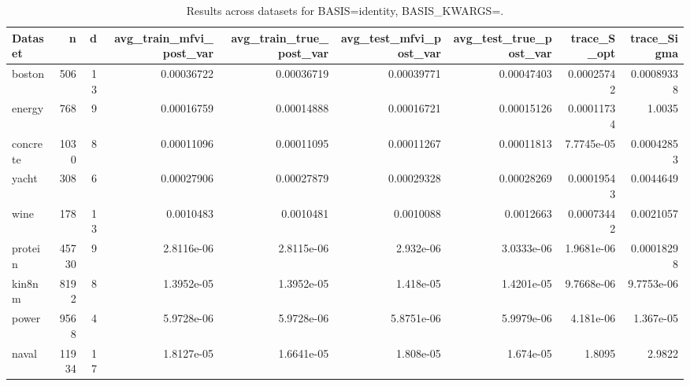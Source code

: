 \begin{table}[t]
\centering
\begin{tabular}{lrrrrrrrr}
\toprule
Dataset & n & d & avg\_train\_mfvi\_post\_var & avg\_train\_true\_post\_var & avg\_test\_mfvi\_post\_var & avg\_test\_true\_post\_var & trace\_S\_opt & trace\_Sigma \\
\midrule
boston & 506 & 13 & 0.00036722 & 0.00036719 & 0.00039771 & 0.00047403 & 0.00025742 & 0.00089338 \\
energy & 768 & 9 & 0.00016759 & 0.00014888 & 0.00016721 & 0.00015126 & 0.00011734 & 1.0035 \\
concrete & 1030 & 8 & 0.00011096 & 0.00011095 & 0.00011267 & 0.00011813 & 7.7745e-05 & 0.00042853 \\
yacht & 308 & 6 & 0.00027906 & 0.00027879 & 0.00029328 & 0.00028269 & 0.00019543 & 0.0044649 \\
wine & 178 & 13 & 0.0010483 & 0.0010481 & 0.0010088 & 0.0012663 & 0.00073442 & 0.0021057 \\
protein & 45730 & 9 & 2.8116e-06 & 2.8115e-06 & 2.932e-06 & 3.0333e-06 & 1.9681e-06 & 0.00018298 \\
kin8nm & 8192 & 8 & 1.3952e-05 & 1.3952e-05 & 1.418e-05 & 1.4201e-05 & 9.7668e-06 & 9.7753e-06 \\
power & 9568 & 4 & 5.9728e-06 & 5.9728e-06 & 5.8751e-06 & 5.9979e-06 & 4.181e-06 & 1.367e-05 \\
naval & 11934 & 17 & 1.8127e-05 & 1.6641e-05 & 1.808e-05 & 1.674e-05 & 1.8095 & 2.9822 \\
\bottomrule
\end{tabular}
\caption{Results across datasets for BASIS=identity, BASIS\_KWARGS={}.}
\label{tab:results}
\end{table}
